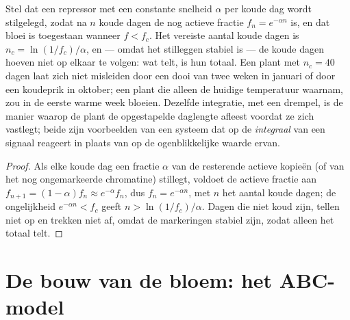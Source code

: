 \begin{theorem}\label{thm:b2:plant-flowering:integration}
Stel dat een repressor met een constante snelheid $\alpha$ per koude dag
wordt stilgelegd, zodat na $n$ koude dagen de nog actieve fractie
$f_n = e^{-\alpha n}$ is, en dat bloei is toegestaan wanneer $f < f_c$.
Het vereiste aantal koude dagen is $n_c = \ln(1/f_c)/\alpha$, en
--- omdat het stilleggen stabiel is --- de koude dagen hoeven niet op
elkaar te volgen: wat telt, is hun totaal. Een plant met $n_c = 40$
dagen laat zich niet misleiden door een dooi van twee weken in januari of
door een koudeprik in oktober; een plant die alleen de huidige temperatuur
waarnam, zou in de eerste warme week bloeien. Dezelfde integratie, met een
drempel, is de manier waarop de plant de opgestapelde daglengte afleest
voordat ze zich vastlegt; beide zijn voorbeelden van een systeem dat op de
\emph{integraal} van een signaal reageert in plaats van op de ogenblikkelijke
waarde ervan.
\end{theorem}
\begin{proof}
Als elke koude dag een fractie $\alpha$ van de resterende actieve kopieën
(of van het nog ongemarkeerde chromatine) stillegt, voldoet de actieve
fractie aan $f_{n+1} = (1 - \alpha)f_n \approx e^{-\alpha}f_n$,
dus $f_n = e^{-\alpha n}$, met $n$ het aantal koude dagen; de
ongelijkheid $e^{-\alpha n} < f_c$ geeft $n > \ln(1/f_c)/\alpha$.
Dagen die niet koud zijn, tellen niet op en trekken niet af, omdat de
markeringen stabiel zijn, zodat alleen het totaal telt.
\end{proof}

\section{De bouw van de bloem: het ABC-model}


